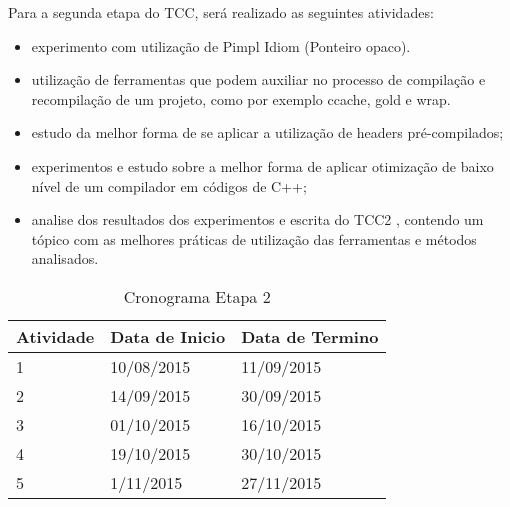 Para a segunda etapa do TCC, será realizado as seguintes atividades:

\begin{itemize}
	\item experimento com utilização de Pimpl Idiom (Ponteiro opaco).
    \item utilização de ferramentas que podem auxiliar no processo de compilação e recompilação de um projeto, como por exemplo ccache, gold e wrap.
    \item estudo da melhor forma de se aplicar a utilização de headers pré-compilados;
    \item experimentos e estudo sobre a melhor forma de aplicar otimização de baixo nível de um compilador em códigos de C++;
    \item analise dos resultados dos experimentos e escrita do TCC2 , contendo um tópico com as melhores práticas de utilização das ferramentas e métodos analisados.
\end{itemize}

\begin{table}[h]
\centering
\begin{tabular}{lll}
\textbf{Atividade}& \textbf{Data de Inicio} & \textbf{Data de Termino} \\ \toprule
1 & 10/08/2015 & 11/09/2015 \\ \midrule 
2 & 14/09/2015 & 30/09/2015 \\ \midrule
3 & 01/10/2015 & 16/10/2015 \\ \midrule 
4 & 19/10/2015 & 30/10/2015 \\ \midrule
5 & 1/11/2015 & 27/11/2015 \\ \bottomrule
\end{tabular} 
\caption{Cronograma Etapa 2}
\label{cronograma2}
\end{table}
